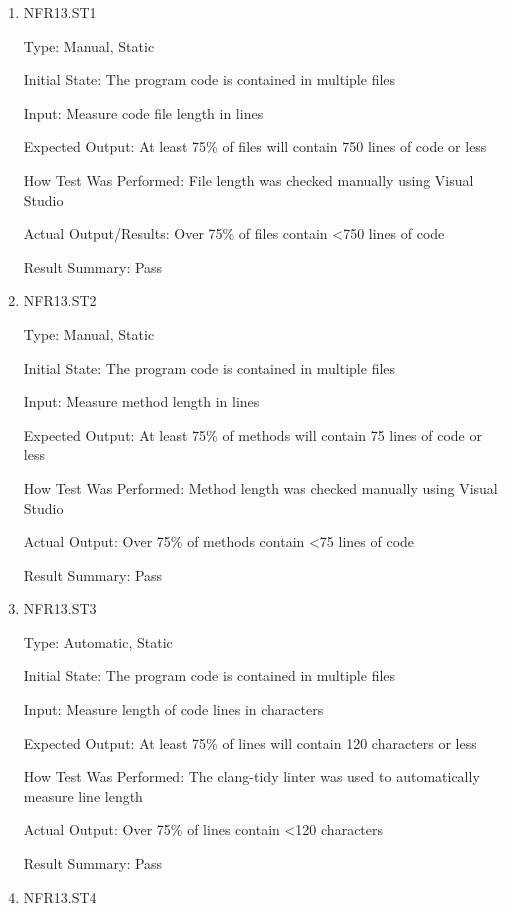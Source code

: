 \documentclass[12pt, titlepage]{article}
\begin{document}
\begin{enumerate}

\item{NFR13.ST1\\}

Type: Manual, Static

Initial State: The program code is contained in multiple files

Input: Measure code file length in lines

Expected Output: At least 75\% of files will contain 750 lines of code or less

How Test Was Performed: File length was checked manually using Visual Studio

Actual Output/Results: Over 75\% of files contain <750 lines of code

Result Summary: Pass

\item{NFR13.ST2\\}

Type: Manual, Static

Initial State: The program code is contained in multiple files

Input: Measure method length in lines

Expected Output: At least 75\% of methods will contain 75 lines of code or less

How Test Was Performed: Method length was checked manually using Visual Studio

Actual Output: Over 75\% of methods contain <75 lines of code

Result Summary: Pass

\item{NFR13.ST3\\}

Type: Automatic, Static

Initial State: The program code is contained in multiple files

Input: Measure length of code lines in characters

Expected Output: At least 75\% of lines will contain 120 characters or less

How Test Was Performed: The clang-tidy linter was used to automatically measure line length

Actual Output: Over 75\% of lines contain <120 characters

Result Summary: Pass

\item{NFR13.ST4\\}


\end{enumerate}
\end{document}
